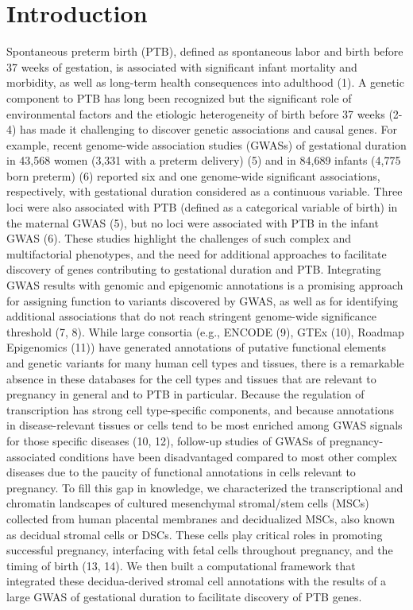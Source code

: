  \section{Introduction}
Spontaneous preterm birth (PTB), defined as spontaneous labor and birth before 37 weeks of gestation, is associated with significant infant mortality and morbidity, as well as long-term health consequences into adulthood (1). A genetic component to PTB has long been recognized but the significant role of environmental factors and the etiologic heterogeneity of birth before 37 weeks (2-4) has made it challenging to discover genetic associations and causal genes. For example, recent genome-wide association studies (GWASs) of gestational duration in 43,568 women (3,331 with a preterm delivery) (5) and in 84,689 infants (4,775 born preterm) (6) reported six and one genome-wide significant associations, respectively, with gestational duration considered as a continuous variable. Three loci were also associated with PTB (defined as a categorical variable of birth) in the maternal GWAS (5), but no loci were associated with PTB in the infant GWAS (6). These studies highlight the challenges of such complex and multifactorial phenotypes, and the need for additional approaches to facilitate discovery of genes contributing to gestational duration and PTB. 
Integrating GWAS results with genomic and epigenomic annotations is a promising approach for assigning function to variants discovered by GWAS, as well as for identifying additional associations that do not reach stringent genome-wide significance threshold (7, 8). While large consortia (e.g., ENCODE (9), GTEx (10), Roadmap Epigenomics (11)) have generated annotations of putative functional elements and genetic variants for many human cell types and tissues, there is a remarkable absence in these databases for the cell types and tissues that are relevant to pregnancy in general and to PTB in particular. Because the regulation of transcription has strong cell type-specific components, and because annotations in disease-relevant tissues or cells tend to be most enriched among GWAS signals for those specific diseases (10, 12), follow-up studies of GWASs of pregnancy-associated conditions have been disadvantaged compared to most other complex diseases due to the paucity of functional annotations in cells relevant to pregnancy. To fill this gap in knowledge, we characterized the transcriptional and chromatin landscapes of cultured mesenchymal stromal/stem cells (MSCs) collected from human placental membranes and decidualized MSCs, also known as decidual stromal cells or DSCs. These cells play critical roles in promoting successful pregnancy, interfacing with fetal cells throughout pregnancy, and the timing of birth (13, 14). We then built a computational framework that integrated these decidua-derived stromal cell annotations with the results of a large GWAS of gestational duration to facilitate discovery of PTB genes. 
